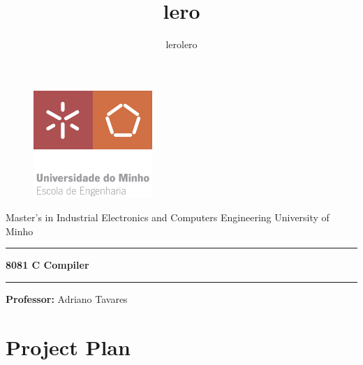 \documentclass[11pt]{article}
\title{lero}
\author{lerolero}
\begin{document}
    \begin{titlepage}
        \centering
        \begin{figure}[h!]  %
            \centering
            \includegraphics[width=0.4\textwidth]{assets/ENG-EN.png}  %
            \label{fig:sample}
        \end{figure}

       
        Master’s in Industrial Electronics and Computers Engineering
        \Large
        University of Minho
        \rule{\textwidth}{0.4pt}
        \textbf{8081 C Compiler}
        \rule{\textwidth}{0.4pt}
        \vspace{5in}

        
        \textbf{Professor:}
        Adriano Tavares

    \end{titlepage}
    
    \newpage
    \tableofcontents

    \newpage
    
    \section{Project Plan}
    
\end{document}
